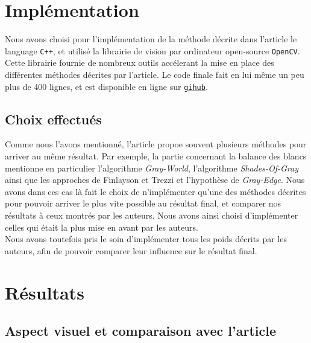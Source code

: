 \documentclass[twoside]{article}
\begin{document}
\section{Implémentation}
Nous avons choisi pour l'implémentation de la méthode décrite dans l'article le language \texttt{C++}, et utilisé la librairie de vision par ordinateur open-source \texttt{OpenCV}. Cette librairie fournie de nombreux outils accélerant la mise en place des différentes méthodes décrites par l'article. Le code finale fait en lui même un peu plus de 400 lignes, et est disponible en ligne sur \texttt{\href{http://github.com/jcaille/Submarine}{gihub}}.

\subsection{Choix effectués}
Comme nous l'avons mentionné, l'article propoe souvent plusieurs méthodes pour arriver au même résultat. Par exemple, la partie concernant la balance des blancs mentionne en particulier l'algorithme \emph{Gray-World}, l'algorithme \emph{Shades-Of-Gray} ainsi que les approches de Finlayson et Trezzi et l'hypothèse de \emph{Gray-Edge}. Nous avons dans ces cas là fait le choix de n'implémenter qu'une des méthodes décrites pour pouvoir arriver le plus vite possible au résultat final, et comparer nos résultats à ceux montrés par les auteurs. Nous avons ainsi choisi d'implémenter celles qui était la plus mise en avant par les auteurs.\\
Nous avons toutefois pris le soin d'implémenter tous les poids décrits par les auteurs, afin de pouvoir comparer leur influence sur le résultat final.

\section{Résultats}
\subsection{Aspect visuel et comparaison avec l'article}
\end{document}
